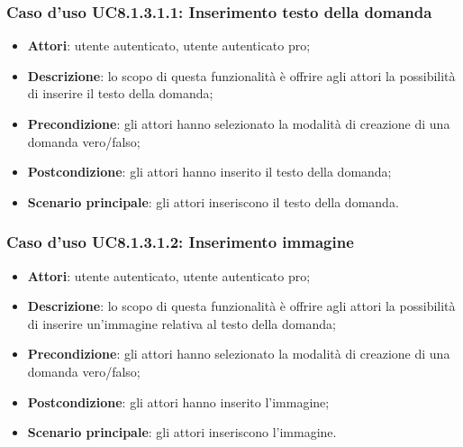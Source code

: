 \subsubsection{Caso d'uso UC8.1.3.1.1: Inserimento testo della domanda}
	\begin{itemize}
		\item
			\textbf{Attori}: utente autenticato, utente autenticato pro;
		\item		
			\textbf{Descrizione}: lo scopo di questa funzionalità è offrire agli attori la possibilità di inserire il testo della domanda;
		\item
			\textbf{Precondizione}: gli attori hanno selezionato la modalità di creazione di una domanda vero/falso; 
		\item
			\textbf{Postcondizione}: gli attori hanno inserito il testo della domanda;
		\item
			\textbf{Scenario principale}: gli attori inseriscono il testo della domanda. 
	 			
	\end{itemize}
	
\subsubsection{Caso d'uso UC8.1.3.1.2: Inserimento immagine}
	\begin{itemize}
		\item
			\textbf{Attori}: utente autenticato, utente autenticato pro;
		\item		
			\textbf{Descrizione}: lo scopo di questa funzionalità è offrire agli attori la possibilità di inserire un'immagine relativa al testo della domanda;
		\item
			\textbf{Precondizione}: gli attori hanno selezionato la modalità di creazione di una domanda vero/falso; 
		\item
			\textbf{Postcondizione}: gli attori hanno inserito l'immagine;
		\item
			\textbf{Scenario principale}: gli attori inseriscono l'immagine. 	
	\end{itemize}
	

